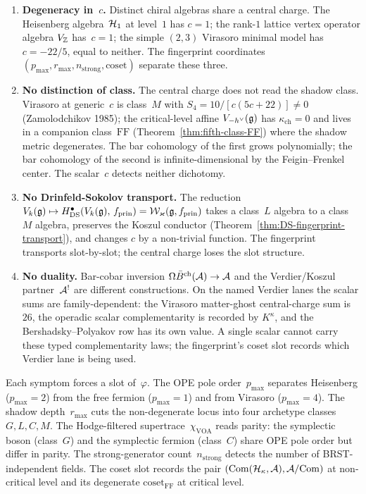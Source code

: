 \begin{enumerate}[leftmargin=*]
 \item \textbf{Degeneracy in~$c$.} Distinct chiral algebras share a
 central charge. The Heisenberg algebra~$\mathcal{H}_1$ at level~$1$ has
 $c = 1$; the rank-$1$ lattice vertex operator algebra
 $V_{\mathbb{Z}}$ has~$c = 1$; the simple $(2,3)$ Virasoro minimal model has
 $c = -22/5$, equal to neither. The fingerprint coordinates
 $(p_{\max}, r_{\max}, n_{\mathrm{strong}}, \mathrm{coset})$ separate
 these three.

 \item \textbf{No distinction of class.} The central charge does not
 read the shadow class. Virasoro at generic~$c$ is class~$M$ with
 $S_4 = 10/[c(5c+22)] \ne 0$ (Zamolodchikov 1985); the critical-level affine
 $V_{-h^\vee}(\mathfrak{g})$ has $\kappa_{\mathrm{ch}} = 0$ and lives in a
 companion class~$\mathrm{FF}$
 \textup{(}Theorem~\ref{thm:fifth-class-FF}\textup{)} where the
 shadow metric degenerates. The bar cohomology of the first grows
 polynomially; the bar cohomology of the second is infinite-dimensional
 by the Feigin--Frenkel center. The scalar~$c$ detects neither
 dichotomy.

 \item \textbf{No Drinfeld-Sokolov transport.} The reduction
 $V_k(\mathfrak{g}) \mapsto H^\bullet_{\mathrm{DS}}(V_k(\mathfrak{g}),\, f_{\mathrm{prin}})
 = \mathcal{W}_{\varkappa}(\mathfrak{g}, f_{\mathrm{prin}})$
 takes a class~$L$ algebra to a class~$M$ algebra, preserves the
 Koszul conductor (Theorem~\ref{thm:DS-fingerprint-transport}), and
 changes $c$ by a non-trivial function. The fingerprint transports
 slot-by-slot; the central charge loses the slot structure.

 \item \textbf{No duality.} Bar-cobar inversion
 $\Omega\bar B^{\mathrm{ch}}(\mathcal{A})\to\mathcal{A}$ and the Verdier/Koszul
 partner~$\mathcal{A}^!$ are different constructions. On the named Verdier
 lanes the scalar sums are family-dependent: the Virasoro
 matter-ghost central-charge sum is~$26$, the operadic scalar
 complementarity is recorded by $K^\kappa$, and the
 Bershadsky--Polyakov row has its own value. A single scalar cannot
 carry these typed complementarity laws; the fingerprint's coset slot
 records which Verdier lane is being used.
\end{enumerate}

Each symptom forces a slot of~$\varphi$. The OPE pole
order~$p_{\max}$ separates Heisenberg ($p_{\max}=2$) from the free
fermion ($p_{\max}=1$) and from Virasoro ($p_{\max}=4$). The shadow
depth~$r_{\max}$ cuts the non-degenerate locus into four archetype
classes~$G,L,C,M$. The Hodge-filtered
supertrace~$\chi_{\mathrm{VOA}}$ reads parity: the
symplectic boson (class~$G$) and the symplectic fermion (class~$C$)
share OPE pole order but differ in parity. The strong-generator
count~$n_{\mathrm{strong}}$ detects the number of
BRST-independent fields. The coset slot records the pair
$(\mathrm{Com}(\mathcal{H}_{\kappa}, \mathcal{A}), \mathcal{A}/\mathrm{Com})$ at
non-critical level and its degenerate
$\mathrm{coset}_{\mathrm{FF}}$ at critical level.

